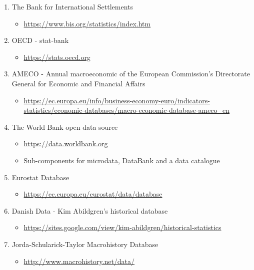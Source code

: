 \documentclass[
]{book}
\providecommand{\tightlist}{%
  \setlength{\itemsep}{0pt}\setlength{\parskip}{0pt}}
\begin{document}
\begin{enumerate}
\def\labelenumi{\arabic{enumi}.}
\tightlist
\item
  The Bank for International Settlements

  \begin{itemize}
  \tightlist
  \item
    \url{https://www.bis.org/statistics/index.htm}
  \end{itemize}
\item
  OECD - stat-bank

  \begin{itemize}
  \tightlist
  \item
    \url{https://stats.oecd.org}
  \end{itemize}
\item
  AMECO - Annual macroeconomic of the European Commission's Directorate General for Economic and Financial Affairs

  \begin{itemize}
  \tightlist
  \item
    \url{https://ec.europa.eu/info/business-economy-euro/indicators-statistics/economic-databases/macro-economic-database-ameco_en}
  \end{itemize}
\item
  The World Bank open data source

  \begin{itemize}
  \tightlist
  \item
    \url{https://data.worldbank.org}
  \item
    Sub-components for microdata, DataBank and a data catalogue
  \end{itemize}
\item
  Eurostat Database

  \begin{itemize}
  \tightlist
  \item
    \url{https://ec.europa.eu/eurostat/data/database}
  \end{itemize}
\item
  Danish Data - Kim Abildgren's historical database

  \begin{itemize}
  \tightlist
  \item
    \url{https://sites.google.com/view/kim-abildgren/historical-statistics}
  \end{itemize}
\item
  Jorda-Schularick-Taylor Macrohistory Database

  \begin{itemize}
  \tightlist
  \item
    \url{http://www.macrohistory.net/data/}
  \end{itemize}
\end{enumerate}
\end{document}
